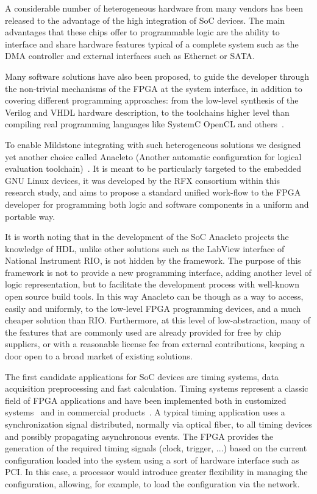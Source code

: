 A considerable number of heterogeneous hardware from many vendors has been released to the advantage of the high integration of SoC devices. The main advantages that these chips offer to programmable logic are the ability to interface and share hardware features typical of a complete system such as the DMA controller and external interfaces such as Ethernet or SATA.

Many software solutions have also been proposed, to guide the developer through the non-trivial mechanisms of the FPGA at the system interface, in addition to covering different programming approaches: from the low-level synthesis of the Verilog and VHDL hardware description, to the toolchains higher level than compiling real programming languages like SystemC OpenCL and others~\cite{ana_7,ana_8}.

To enable Mildstone integrating with such heterogeneous solutions we designed yet another choice called Anacleto (Another automatic configuration for logical evaluation toolchain)~\cite{RIGONI2018122}. It is meant to be particularly targeted to the embedded GNU Linux devices, it was developed by the RFX consortium within this research study, and aims to propose a standard unified work-flow to the FPGA developer for programming both logic and software components in a uniform and portable way.

It is worth noting that in the development of the SoC Anacleto projects the knowledge of HDL, unlike other solutions such as the LabView interface of National Instrument RIO, is not hidden by the framework. The purpose of this framework is not to provide a new programming interface, adding another level of logic representation, but to facilitate the development process with well-known open source build tools. In this way Anacleto can be though as a way to access, easily and uniformly, to the low-level FPGA programming devices, and a much cheaper solution than RIO. Furthermore, at this level of low-abstraction, many of the features that are commonly used are already provided for free by chip suppliers, or with a reasonable license fee from external contributions, keeping a door open to a broad market of existing solutions.

The first candidate applications for SoC devices are timing systems, data acquisition preprocessing and fast calculation. Timing systems represent a classic field of FPGA applications and have been implemented both in customized systems~\cite{ana_9} and in commercial products~\cite{ana_10}. A typical timing application uses a synchronization signal distributed, normally via optical fiber, to all timing devices and possibly propagating asynchronous events. The FPGA provides the generation of the required timing signals (clock, trigger, ...) based on the current configuration loaded into the system using a sort of hardware interface such as PCI. In this case, a processor would introduce greater flexibility in managing the configuration, allowing, for example, to load the configuration via the network.

